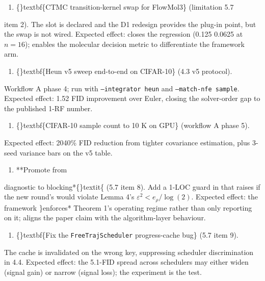 \documentclass{article}
\begin{document}
\begin{enumerate}
\item \{\}textbf\{CTMC transition-kernel swap for FlowMol3\} (limitation 5.7
\end{enumerate}
item 2). The  slot is declared and the D1 redesign provides the plug-in point, but the swap is not wired. Expected effect: closes the  regression (0.125  0.0625 at $n=16$); enables the molecular decision metric to differentiate the framework arm.

\begin{enumerate}
\item \{\}textbf\{Heun v5 sweep end-to-end on CIFAR-10\} (4.3 v5 protocol).
\end{enumerate}
Workflow A phase 4; run with \texttt{--integrator heun} and \texttt{--match-nfe sample}. Expected effect: 1.52 FID improvement over Euler, closing the solver-order gap to the published 1-RF number.

\begin{enumerate}
\item \{\}textbf\{CIFAR-10 sample count to 10 K on GPU\} (workflow A phase 5).
\end{enumerate}
Expected effect: 2040\% FID reduction from tighter covariance estimation, plus 3-seed variance bars on the v5 table.

\begin{enumerate}
\item **Promote  from
\end{enumerate}
diagnostic to blocking*\{\}textit\{ (5.7 item 8). Add a 1-LOC guard in  that raises if the new round's  would violate Lemma 4's $\varepsilon^2 < e_\rho / \log(2)$. Expected effect: the framework \}enforces* Theorem 1's operating regime rather than only reporting on it; aligns the paper claim with the algorithm-layer behaviour.

\begin{enumerate}
\item \{\}textbf\{Fix the \texttt{FreeTrajScheduler} progress-cache bug\} (5.7 item 9).
\end{enumerate}
The cache is invalidated on the wrong key, suppressing scheduler discrimination in 4.4. Expected effect: the 5.1-FID spread across schedulers may either widen (signal gain) or narrow (signal loss); the experiment is the test.
\end{document}
